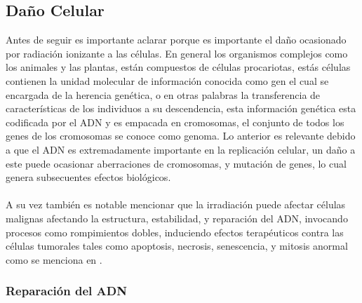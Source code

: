 \subsection{Daño Celular}
Antes de seguir es importante aclarar porque es importante el daño ocasionado por radiación ionizante a las células. En general los organismos complejos como los animales y las plantas, están compuestos de células procariotas, estás células contienen la unidad molecular de información conocida como gen el cual se encargada de la herencia genética, o en otras palabras la transferencia de características de los individuos a su descendencia, esta información genética esta codificada por el ADN y es empacada en cromosomas, el conjunto de todos los genes de los cromosomas se conoce como genoma. Lo anterior es relevante debido a que el ADN es extremadamente importante en la replicación celular, un daño a este puede ocasionar aberraciones de cromosomas, y mutación de genes, lo cual genera subsecuentes efectos biológicos.\\
\\
A su vez también es notable mencionar que la irradiación puede afectar células malignas afectando la estructura, estabilidad, y reparación del ADN, invocando procesos como rompimientos dobles, induciendo efectos terapéuticos contra las células tumorales tales como apoptosis, necrosis, senescencia, y mitosis anormal como se menciona en \cite{cancer}.\\



\subsubsection{Reparación del ADN}

